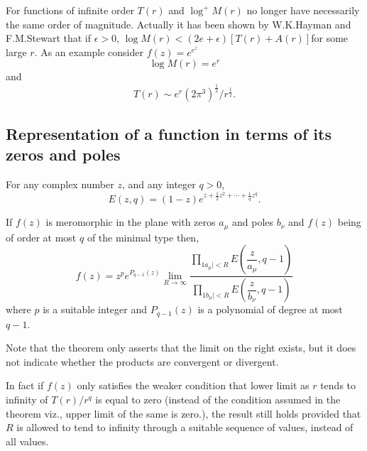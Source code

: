 \begin{remark*}
For functions of infinite order $T(r)$ and $\log^{+}M(r)$ no longer
have necessarily the same order of magnitude. Actually it has been
shown by W.K.\@ Hayman and F.M.\@ Stewart \cite{1} that if $\epsilon
>0$, $\log M(r)<(2e+\epsilon)[T(r)+A(r)]$\pageoriginale for some large
$r$. As an example consider $f(z)=e^{e^{z}}$
$$
\log M(r)=e^{r}
$$
and
$$
T(r)\sim e^{r}(2\pi^{3})^{\frac{1}{2}}/r^{\frac{1}{2}}.
$$
\end{remark*}

\subsection[Representation of a function....]{Representation of a function in terms of its zeros and
  poles}\label{part1-sec1.8}

\pageoriginale
\begin{defi*}
For any complex number $z$, and any integer $q>0$,
$$
E(z,q)=(1-z)e^{z+\frac{1}{2}z^{2}+\cdots+\frac{1}{q}z^{q}}.
$$
\end{defi*}

\begin{thm}[Nevanlinna]\label{part1-thm5}
If $f(z)$ is meromorphic in the plane with zeros $a_{\mu}$ and poles
$b_{\nu}$ and $f(z)$ being of order at most $q$ of the minimal type
then,
$$
f(z)=z^{p}e^{P_{q-1}(z)}\lim\limits_{R\to
  \infty}\frac{\prod\limits_{1a_{\mu}|<R} E\left(\dfrac{z}{a_{\mu}},
  q-1\right)}{\prod\limits_{1b_{\mu}|<R} 
  E\left(\dfrac{z}{b_{\nu}},q-1\right)} 
$$
where $p$ is a suitable integer and $P_{q-1}(z)$ is a polynomial of
degree at most $q-1$.
\end{thm}

Note that the theorem only asserts that the limit on the right exists,
but it does not indicate whether the products are convergent or
divergent.

In fact if $f(z)$ only satisfies the weaker condition that lower limit
as $r$ tends to infinity of $T(r)/r^{q}$ is equal to zero (instead of
the condition assumed in the theorem viz., upper limit of the same is
zero.), the result still holds provided that $R$ is allowed to tend to
infinity through a suitable sequence of values, instead of all values.

